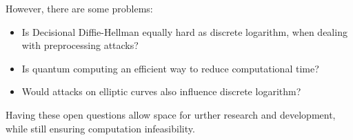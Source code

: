 However, there are some problems:
\begin{itemize}
	\item Is Decisional Diffie-Hellman equally hard as discrete logarithm, when dealing with preprocessing attacks?
	\item Is quantum computing an efficient way to reduce computational time?
	\item Would attacks on elliptic curves also influence discrete logarithm?
\end{itemize}

Having these open questions allow space for urther research and development, while still ensuring computation infeasibility. 